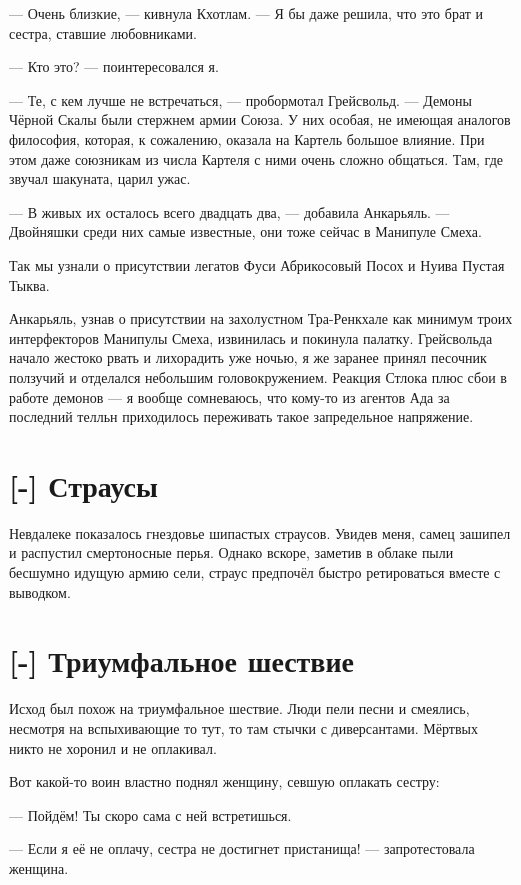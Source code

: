 --- Очень близкие, --- кивнула Кхотлам.
--- Я бы даже решила, что это брат и сестра, ставшие любовниками.

--- Кто это? --- поинтересовался я.

--- Те, с кем лучше не встречаться, --- пробормотал Грейсвольд.
--- Демоны Чёрной Скалы были стержнем армии Союза.
У них особая, не имеющая аналогов философия, которая, к сожалению, оказала на Картель большое влияние.
При этом даже союзникам из числа Картеля с ними очень сложно общаться.
Там, где звучал шакуната, царил ужас.

--- В живых их осталось всего двадцать два, --- добавила Анкарьяль.
--- Двойняшки среди них самые известные, они тоже сейчас в Манипуле Смеха.

Так мы узнали о присутствии легатов Фуси Абрикосовый Посох и Нуива Пустая Тыква.

Анкарьяль, узнав о присутствии на захолустном Тра-Ренкхале как минимум троих интерфекторов Манипулы Смеха, извинилась и покинула палатку.
Грейсвольда начало жестоко рвать и лихорадить уже ночью, я же заранее принял песочник ползучий и отделался небольшим головокружением.
Реакция Стлока плюс сбои в работе демонов --- я вообще сомневаюсь, что кому-то из агентов Ада за последний телльн приходилось переживать такое запредельное напряжение.

\section{[-] Страусы}

Невдалеке показалось гнездовье шипастых страусов.
Увидев меня, самец зашипел и распустил смертоносные перья.
Однако вскоре, заметив в облаке пыли бесшумно идущую армию сели, страус предпочёл быстро ретироваться вместе с выводком.

\section{[-] Триумфальное шествие}

Исход был похож на триумфальное шествие.
Люди пели песни и смеялись, несмотря на вспыхивающие то тут, то там стычки с диверсантами.
Мёртвых никто не хоронил и не оплакивал.

Вот какой-то воин властно поднял женщину, севшую оплакать сестру:

--- Пойдём!
Ты скоро сама с ней встретишься.

--- Если я её не оплачу, сестра не достигнет пристанища! --- запротестовала женщина.

